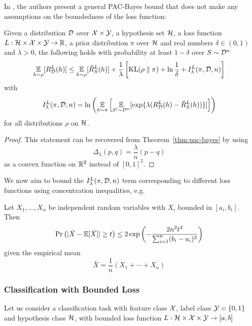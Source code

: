 In \cite{alquier2016properties}, the authors present a general PAC-Bayes bound
that does not make any assumptions on the boundedness of the loss function:
\begin{theorem}
  Given a distribution $\mathcal{D}$ over $\mathcal{X} \times \mathcal{Y}$, a hypothesis set $\mathcal{H}$, a
  loss function $L : \mathcal{H} \times \mathcal{X} \times \mathcal{Y} \to \mathbb{R}$, a prior distribution
  $\pi$ over $\mathcal{H}$ and real numbers $\delta \in (0, 1)$ and $\lambda > 0$, the
  following holds with probability at least $1 - \delta$ over $S \sim \mathcal{D}^n$
  \begin{equation}
    \label{eq:alquier-bound}
    \operatorname*{\mathbb{E}}_{h \sim \rho}[R_{\mathcal{D}}^L(h)] \leq \operatorname*{\mathbb{E}}_{h \sim \rho}[\hat{R}_S^L(h)] +
    \frac{1}{\lambda}\left[\text{KL}(\rho \parallel \pi) + \ln \frac{1}{\delta} +
    I_\lambda^L(\pi, \mathcal{D}, n)\right]
  \end{equation}
  with
  \begin{equation}
    I_\lambda^L(\pi, \mathcal{D}, n) = \ln\left(\operatorname*{\mathbb{E}}_{h \sim \pi}\left[\operatorname*{\mathbb{E}}_{S' \sim
    \mathcal{D}^n}[\exp\{\lambda(R_{\mathcal{D}}^L(h) - \hat{R}_S^L(h))\}]\right]\right)
  \end{equation}
  for all distributions $\rho$ on $\mathcal{H}$.
\end{theorem}

\begin{proof}
  This statement can be recovered from Theorem~\ref{thm:pac-bayes} by using
  \begin{equation}
    \Delta_\lambda(p, q) = \frac{\lambda}{n} (p - q)
  \end{equation}
  as a convex function on $\mathbb{R}^2$ instead of $[0, 1]^2$.
\end{proof}

We now aim to bound the $I_\lambda^L(\pi, \mathcal{D}, n)$ term corresponding to
different loss functions using concentration inequalities, e.g.\:

\begin{lemma}
  Let $X_1, \ldots, X_n$ be independent random variables with $X_i$ bounded in
  $[a_i, b_i]$. Then
  \begin{equation}
    \Pr\left(| \bar{X} - \operatorname*{\mathbb{E}}[\bar{X}] | \geq t\right) \leq 2 \exp\left(- \frac{2
    n^2 t^2}{\sum_{i = 1}^n (b_i - a_i)^2}\right)
  \end{equation}
  given the empirical mean
  \begin{equation}
    \bar{X} = \frac{1}{n}(X_1 + \cdots + X_n)
  \end{equation}
\end{lemma}

\subsubsection{Classification with Bounded Loss}

Let us consider a classification task with feature class $\mathcal{X}$, label class $\mathcal{Y}
= \{0, 1\}$ and hypothesis class $\mathcal{H}$, with bounded loss function $L : \mathcal{H}
\times \mathcal{X} \times \mathcal{Y} \to [a, b]$
